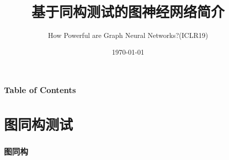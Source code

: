 \documentclass{beamer}
\title %
{基于同构测试的图神经网络简介}
\author %
{How Powerful are Graph Neural Networks?(ICLR19)}
\date %
{\today}
\begin{document}
\frame{\titlepage}


\begin{frame}
\frametitle{Table of Contents}
\tableofcontents
\end{frame}


\section{图同构测试}

\begin{frame}

  \frametitle{图同构}


\end{frame}
\end{document}
